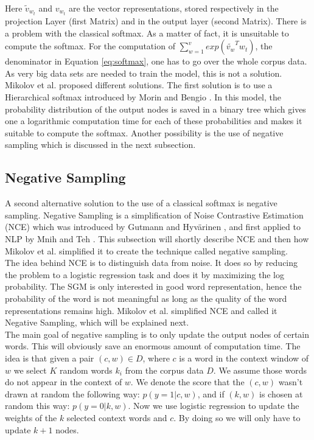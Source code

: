 Here $\tilde{v}_{w_t}$ and $ v_{w_t}$ are the vector representations, stored respectively in the projection Layer (first Matrix) and in the output layer (second Matrix). There is a problem with the classical softmax. As a matter of fact, it is unsuitable to compute the softmax. For the computation of $\sum_{w=1}^v exp(\tilde{v_w}^T w_t)$, the denominator in Equation \ref{eq:softmax}, one has to go over the whole corpus data. As very big data sets are needed to train the model, this is not a solution. Mikolov et al. \cite{mikolov2} proposed different solutions. The first solution is to use a Hierarchical softmax introduced by Morin and Bengio \cite{hsoftmax}. In this model, the probability distribution of the output nodes is saved in a binary tree which gives one a logarithmic computation time for each of these probabilities and makes it suitable to compute the softmax. Another possibility is the use of negative sampling which is discussed in the next subsection.

\subsection{Negative Sampling}
A second alternative solution to the use of a classical softmax is negative sampling. Negative Sampling is a simplification of Noise Contrastive Estimation (NCE) which was introduced by Gutmann and Hyv{\"a}rinen \cite{nce-original}, and first applied to NLP by Mnih and Teh \cite{mnih}. This subsection will shortly describe NCE and then how Mikolov et al. \cite{mikolov2} simplified it to create the technique called negative sampling. \\ The idea behind NCE is to distinguish data from noise. It does so by reducing the problem to a logistic regression task and does it by maximizing the log probability. The SGM is only interested in good word representation, hence the probability of the word is not meaningful as long as the quality of the word representations remains high. Mikolov et al. \cite{mikolov2} simplified NCE and called it Negative Sampling, which will be explained next.\\
The main goal of negative sampling is to only update the output nodes of certain words. This will obviously save an enormous amount of computation time. The idea is that given a pair $(c,w) \in D$, where $c$ is a word in the context window of $w$ we select $K$ random words $k_i$ from the corpus data $D$. We assume those words do not appear in the context of $w$. We denote the score that the $(c,w)$ wasn't drawn at random the following way: $p(y=1|c,w)$, and if $(k,w) $ is chosen at random this way: $p(y=0|k,w)$. Now we use logistic regression to update the weights of the $k$ selected context words and $c$. By doing so we will only have to update $k+1$ nodes.

